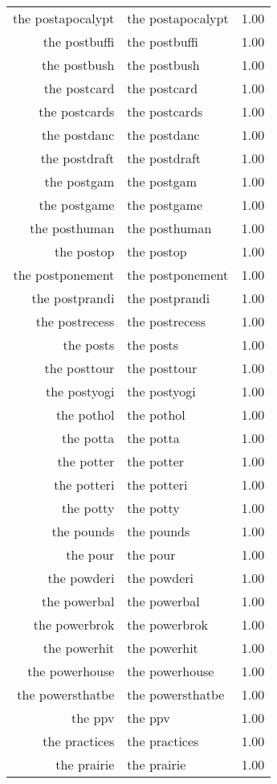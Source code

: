 \begin{table}[ht]
\begin{tabular}{rlr}
  the postapocalypt & the postapocalypt & 1.00 \\ 
  the postbuffi & the postbuffi & 1.00 \\ 
  the postbush & the postbush & 1.00 \\ 
  the postcard & the postcard & 1.00 \\ 
  the postcards & the postcards & 1.00 \\ 
  the postdanc & the postdanc & 1.00 \\ 
  the postdraft & the postdraft & 1.00 \\ 
  the postgam & the postgam & 1.00 \\ 
  the postgame & the postgame & 1.00 \\ 
  the posthuman & the posthuman & 1.00 \\ 
  the postop & the postop & 1.00 \\ 
  the postponement & the postponement & 1.00 \\ 
  the postprandi & the postprandi & 1.00 \\ 
  the postrecess & the postrecess & 1.00 \\ 
  the posts & the posts & 1.00 \\ 
  the posttour & the posttour & 1.00 \\ 
  the postyogi & the postyogi & 1.00 \\ 
  the pothol & the pothol & 1.00 \\ 
  the potta & the potta & 1.00 \\ 
  the potter & the potter & 1.00 \\ 
  the potteri & the potteri & 1.00 \\ 
  the potty & the potty & 1.00 \\ 
  the pounds & the pounds & 1.00 \\ 
  the pour & the pour & 1.00 \\ 
  the powderi & the powderi & 1.00 \\ 
  the powerbal & the powerbal & 1.00 \\ 
  the powerbrok & the powerbrok & 1.00 \\ 
  the powerhit & the powerhit & 1.00 \\ 
  the powerhouse & the powerhouse & 1.00 \\ 
  the powersthatbe & the powersthatbe & 1.00 \\ 
  the ppv & the ppv & 1.00 \\ 
  the practices & the practices & 1.00 \\ 
  the prairie & the prairie & 1.00 \\ 

\end{tabular}
\end{table}
